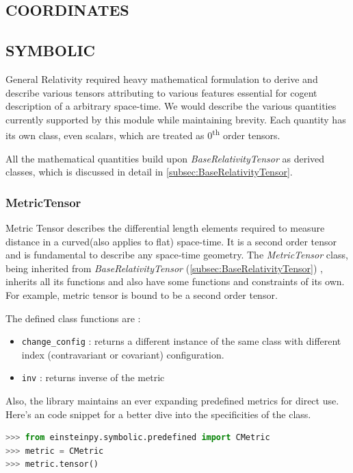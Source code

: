 \documentclass{aastex63}
\begin{document}
\subsection{COORDINATES}
\subsection{SYMBOLIC}
General Relativity required heavy mathematical formulation to derive and describe various tensors attributing to various features essential for cogent description of a arbitrary space-time. We would describe the various quantities currently supported by this module while maintaining brevity. Each quantity has its own class, even scalars, which are treated as 0\textsuperscript{th} order tensors.

All the mathematical quantities build upon \textit{BaseRelativityTensor} as derived classes, which is discussed in detail in \ref{subsec:BaseRelativityTensor}. 

\subsubsection{MetricTensor}\label{subsubsec:metric}
Metric Tensor describes the differential length elements required to measure distance in a curved(also applies to flat) space-time. It is a second order tensor and is fundamental to describe any space-time geometry. The \textit{MetricTensor} class, being inherited from \textit{BaseRelativityTensor} (\ref{subsec:BaseRelativityTensor}) , inherits all its functions and also have some functions and constraints of its own. For example, metric tensor is bound to be a second order tensor.

The defined class functions are :
\begin{itemize}
\item \texttt{change\_config} : returns a different instance of the same class with different index (contravariant or covariant) configuration. 
\item \texttt{inv} : returns inverse of the metric
\end{itemize}

Also, the library maintains an ever expanding predefined metrics for direct use. Here's an code snippet for a better dive into the specificities of the class.

\begin{lstlisting}[language=Python, caption=Importing a predefined metric]
>>> from einsteinpy.symbolic.predefined import CMetric
>>> metric = CMetric
>>> metric.tensor()
\end{lstlisting}
\end{document}
